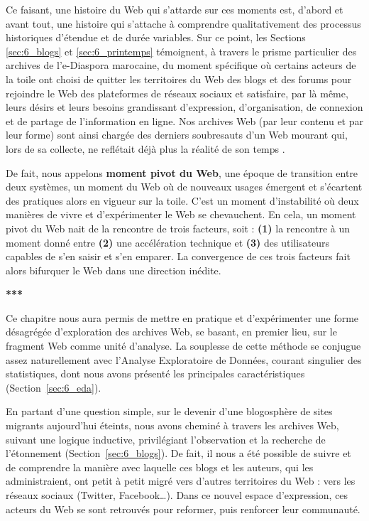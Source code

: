 \documentclass[symmetric,justified,marginals=raggedouter]{tufte-book}
\begin{document}
Ce faisant, une histoire du Web qui s'attarde sur ces moments est, d'abord et avant tout, une histoire qui s'attache à comprendre qualitativement des processus historiques d'étendue et de durée variables. Sur ce point, les Sections \ref{sec:6_blogs} et \ref{sec:6_printemps} témoignent, à travers le prisme particulier des archives de l'e-Diaspora marocaine, du moment spécifique où certains acteurs de la toile ont choisi de quitter les territoires du Web des blogs et des forums pour rejoindre le Web des plateformes de réseaux sociaux et satisfaire, par là même, leurs désirs et leurs besoins grandissant d'expression, d'organisation, de connexion et de partage de l'information en ligne. Nos archives Web (par leur contenu et par leur forme) sont ainsi chargée des derniers soubresauts d'un Web mourant \citep{stevenson_hypertext_2018} qui, lors de sa collecte, ne reflétait déjà plus la réalité de son temps \citep{helmond_platformization_2015}.

De fait, nous appelons \textbf{moment pivot du Web}, une époque de transition entre deux systèmes, un moment du Web où de nouveaux usages émergent et s'écartent des pratiques alors en vigueur sur la toile. C'est un moment d'instabilité où deux manières de vivre et d'expérimenter le Web se chevauchent. En cela, un moment pivot du Web nait de la rencontre de trois facteurs, soit : \textbf{(1)} la rencontre à un moment donné entre \textbf{(2)} une accélération technique et \textbf{(3)} des utilisateurs capables de s'en saisir et s'en emparer. La convergence de ces trois facteurs fait alors bifurquer le Web dans une direction inédite.

\begin{center}
	\textbf{***}
\end{center}

\noindent Ce chapitre nous aura permis de mettre en pratique et d'expérimenter une forme désagrégée d'exploration des archives Web, se basant, en premier lieu, sur le fragment Web comme unité d'analyse. La souplesse de cette méthode se conjugue assez naturellement avec l'Analyse Exploratoire de Données, courant singulier des statistiques, dont nous avons présenté les principales caractéristiques (Section~\ref{sec:6_eda}).

En partant d'une question simple, sur le devenir d'une blogosphère de sites migrants aujourd'hui éteints, nous avons cheminé à travers les archives Web, suivant une logique inductive, privilégiant l'observation et la recherche de l'étonnement (Section~\ref{sec:6_blogs}). De fait, il nous a été possible de suivre et de comprendre la manière avec laquelle ces blogs et les auteurs, qui les administraient, ont petit à petit migré vers d'autres territoires du Web : vers les réseaux sociaux (Twitter, Facebook\ldots{}). Dans ce nouvel espace d'expression, ces acteurs du Web se sont retrouvés pour reformer, puis renforcer leur communauté. 
\end{document}
